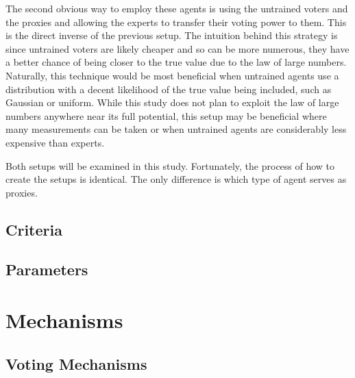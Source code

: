 The second obvious way to employ these agents is using the untrained voters
and the proxies and allowing the experts to transfer their voting power to them.
This is the direct inverse of the previous setup.
The intuition behind this strategy is since untrained voters are likely
cheaper and so can be more numerous, they have a better chance of being closer
to the true value due to the law of large numbers.
Naturally, this technique would be most beneficial when untrained agents use a
distribution with a decent likelihood of the true value being included, such
as Gaussian or uniform.
While this study does not plan to exploit the law of large numbers anywhere
near its full potential, this setup may be beneficial where many measurements
can be taken or when untrained agents are considerably less expensive than
experts.

Both setups will be examined in this study.
Fortunately, the process of how to create the setups is identical.
The only difference is which type of agent serves as proxies.


\subsection{Criteria}\label{subsec:criteria}

\subsection{Parameters}\label{subsec:parameters}

\section{Mechanisms}\label{sec:mechanisms}

\subsection{Voting Mechanisms}\label{subsec:voting-mechanisms}

